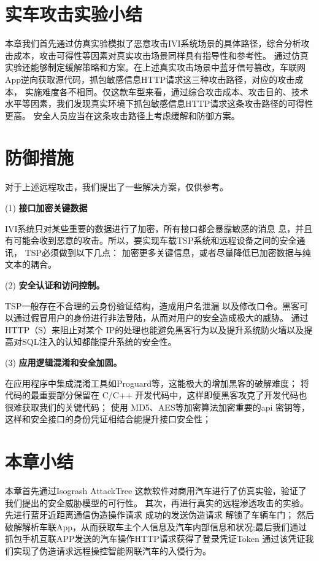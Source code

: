 \section{实车攻击实验小结}
本章我们首先通过仿真实验模拟了恶意攻击IVI系统场景的具体路径，综合分析攻击成本，攻击可得性等因素对真实攻击场景同样具有指导性和参考性。
通过仿真实验还能够制定缓解策略和方案。在上述真实攻击场景中蓝牙信号篡改，车联网App逆向获取源代码，抓包敏感信息HTTP请求这三种攻击路径，对应的攻击成本，
实施难度各不相同。仅这款车型来看，通过综合攻击成本、攻击目的、技术水平等因素，我们发现真实环境下抓包敏感信息HTTP请求这条攻击路径的可得性更高。
安全人员应当在这条攻击路径上考虑缓解和防御方案。

\section{防御措施}
对于上述远程攻击，我们提出了一些解决方案，仅供参考。

(1) \textbf{接口加密关键数据}

IVI系统只对某些重要的数据进行了加密，所有接口都会暴露敏感的消息
息，并且有可能会收到恶意的攻击。所以，要实现车载TSP系统和远程设备之间的安全通讯， TSP必须做到以下几点：
加密更多关键信息，或者尽量降低已加密数据与纯文本的耦合。

(2) \textbf{安全认证和访问控制。} 

TSP一般存在不合理的云身份验证结构，造成用户名泄漏
以及修改口令。黑客可以通过假冒用户的身份进行非法登陆，从而对用户的安全造成极大的威胁。
通过 HTTP（S）来阻止对某个 IP的处理也能避免黑客行为以及提升系统防火墙以及提高对SQL注入的认知都能提升系统的安全性。

(3) \textbf{应用逻辑混淆和安全加固。} 

在应用程序中集成混淆工具如Proguard等，这能极大的增加黑客的破解难度；
将代码的最重要部分保留在 C/C++ 开发代码中，这样即便黑客攻克了开发代码也很难获取我们的关键代码；
使用 MD5、AES等加密算法加密重要的api 密钥等，这样和安全接口的身份凭证相结合能提升接口安全性；

\section{本章小结}
本章首先通过Isogrash AttackTree 这款软件对商用汽车进行了仿真实验，验证了我们提出的安全威胁模型的可行性。
其次，再进行真实的远程渗透攻击的实验。先进行蓝牙近距离通信伪造操作请求 成功的发送伪造请求 解锁了车辆车门；
然后破解解析车联App，从而获取车主个人信息及汽车内部信息和状况;最后我们通过抓包手机互联APP发送的汽车操作HTTP请求获得了登录凭证Token
通过该凭证我们实现了伪造请求远程操控智能网联汽车的入侵行为。
